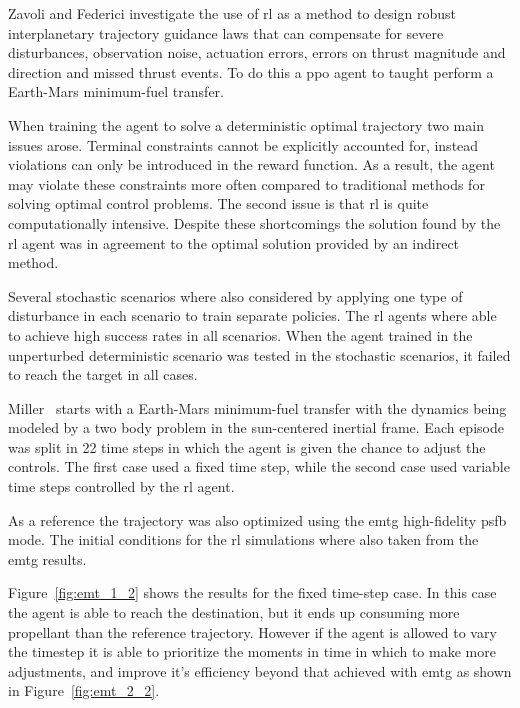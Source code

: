 Zavoli and Federici \cite{zavoli2020reinforcement} investigate the use of \acrshort{rl} as a method to design robust interplanetary trajectory guidance laws that can compensate for severe disturbances, observation noise, actuation errors, errors on thrust magnitude and direction and missed thrust events. To do this a \acrshort{ppo} agent to taught perform a Earth-Mars minimum-fuel transfer.

When training the agent to solve a deterministic optimal trajectory two main issues arose. Terminal constraints cannot be explicitly accounted for, instead violations can only be introduced in the reward function. As a result, the agent may violate these constraints more often compared to traditional methods for solving optimal control problems. The second issue is that \acrshort{rl} is quite computationally intensive.  Despite these shortcomings the solution found by the \acrshort{rl} agent was in agreement to the optimal solution provided by an indirect method.

Several stochastic scenarios where also considered by applying one type of disturbance in each scenario to train separate policies. The \acrshort{rl} agents where able to achieve high success rates in all scenarios. When the agent trained in the unperturbed deterministic scenario was tested in the stochastic scenarios, it failed to reach the target in all cases.

Miller~\cite{miller2020low} starts with a Earth-Mars minimum-fuel transfer with the dynamics being modeled by a two body problem in the sun-centered inertial frame. Each episode was split in 22 time steps in which the agent is given the chance to adjust the controls. The first case used a fixed time step, while the second case used variable time steps controlled by the \acrshort{rl} agent.

As a reference the trajectory was also optimized using the \acrfull{emtg} high-fidelity \acrfull{psfb} mode. The initial conditions for the \acrshort{rl} simulations where also taken from the \acrshort{emtg} results.

Figure~\ref{fig:emt_1_2} shows the results for the fixed time-step case. In this case the agent is able to reach the destination, but it ends up consuming more propellant than the reference trajectory. However if the agent is allowed to vary the timestep it is able to prioritize the moments in time in which to make more adjustments, and improve it's efficiency beyond that achieved with \acrshort{emtg} as shown in Figure~\ref{fig:emt_2_2}.

